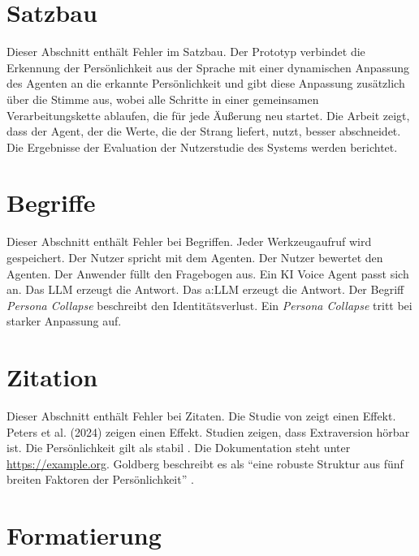 \section{Satzbau}
\label{sec:satz}

Dieser Abschnitt enthält Fehler im Satzbau. %
Der Prototyp verbindet die Erkennung der Persönlichkeit aus der Sprache mit einer dynamischen Anpassung des Agenten an die erkannte Persönlichkeit und gibt diese Anpassung zusätzlich über die Stimme aus, wobei alle Schritte in einer gemeinsamen Verarbeitungskette ablaufen, die für jede Äußerung neu startet. %
Die Arbeit zeigt, dass der Agent, der die Werte, die der Strang liefert, nutzt, besser abschneidet. %
Die Ergebnisse der Evaluation der Nutzerstudie des Systems werden berichtet. %

\section{Begriffe}
\label{sec:begriffe}

Dieser Abschnitt enthält Fehler bei Begriffen.
Jeder Werkzeugaufruf wird gespeichert. %
Der Nutzer spricht mit dem Agenten.
Der Nutzer bewertet den Agenten.
Der Anwender füllt den Fragebogen aus. %
Ein KI Voice Agent passt sich an. %
Das LLM erzeugt die Antwort. %
Das \gls{a:LLM} erzeugt die Antwort.
Der Begriff \emph{Persona Collapse} beschreibt den Identitätsverlust.
Ein \emph{Persona Collapse} tritt bei starker Anpassung auf. %

\section{Zitation}
\label{sec:zitation}

Dieser Abschnitt enthält Fehler bei Zitaten.
Die Studie von \textcite{unbekannt2020} zeigt einen Effekt. %
Peters et al. (2024) zeigen einen Effekt. %
Studien zeigen, dass Extraversion hörbar ist. %
Die Persönlichkeit gilt als stabil \cite{goldberg1990}. %
Die Dokumentation steht unter \url{https://example.org}. %
Goldberg beschreibt es als \enquote{eine robuste Struktur aus fünf breiten Faktoren der Persönlichkeit} \parencite{goldberg1990}. %

\section{Formatierung}
\label{sec:format}

